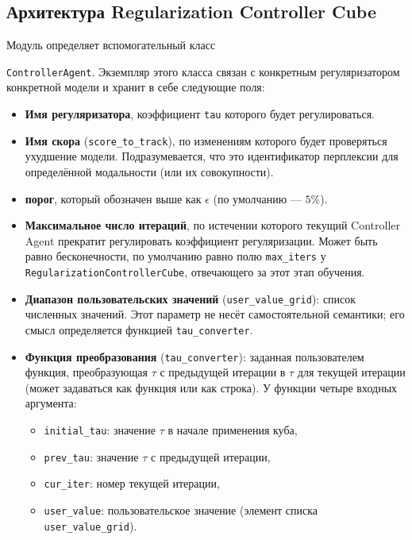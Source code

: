 \subsection{Архитектура Regularization Controller Cube} 

Модуль определяет вспомогательный класс

\texttt{ControllerAgent}. Экземпляр этого класса связан с конкретным регуляризатором конкретной модели и хранит в себе следующие поля: 

\begin{itemize}

    \item \textbf{Имя регуляризатора}, коэффициент \texttt{tau} которого будет регулироваться.

    \item \textbf{Имя скора} (\texttt{score\_to\_track}), по изменениям которого будет проверяться ухудшение модели. Подразумевается, что это идентификатор перплексии для определённой модальности (или их совокупности).

    \item \textbf{порог}, который обозначен выше как $\epsilon$ (по умолчанию --- $5\%$).

    \item \textbf{Максимальное число итераций}, по истечении которого текущий Controller Agent  прекратит регулировать коэффициент регуляризации. Может быть равно бесконечности, по умолчанию равно полю \texttt{max\_iters} у  \texttt{RegularizationControllerCube}, отвечающего за этот этап обучения.

    \item \textbf{Диапазон пользовательских значений} (\texttt{user\_value\_grid}): список численных значений. Этот параметр не несёт самостоятельной семантики; его смысл определяется функцией \texttt{tau\_converter}.

    \item \textbf{Функция преобразования} (\texttt{tau\_converter}): заданная пользователем функция, преобразующая $\tau$ с предыдущей итерации в $\tau$ для текущей итерации (может задаваться как функция или как строка). У функции четыре входных аргумента:

    \begin{itemize}

        \item \texttt{initial\_tau}: значение $\tau$ в начале применения куба,

        \item \texttt{prev\_tau}: значение $\tau$ с предыдущей итерации,

        \item  \texttt{cur\_iter}: номер текущей итерации,

        \item \texttt{user\_value}: пользовательское значение (элемент списка \texttt{user\_value\_grid}).

    \end{itemize}

\end{itemize} 

